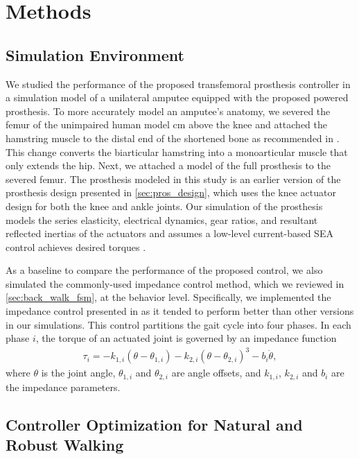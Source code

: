 \section{Methods}
\subsection{Simulation Environment}\label{sec:complete_simulation_environ}

We studied the performance of the proposed transfemoral prosthesis controller in
a simulation model of a unilateral amputee equipped with the proposed powered
prosthesis. To more accurately model an amputee's anatomy, we severed the femur
of the unimpaired human model \unit[11]{cm} above the knee and attached the
hamstring muscle to the distal end of the shortened bone as recommended in
\citet{brown2012amputation}. This change converts the biarticular hamstring into
a monoarticular muscle that only extends the hip. Next, we attached a model of
the full prosthesis to the severed femur. The prosthesis modeled in this study
is an earlier version of the prosthesis design presented in
\cref{sec:pros_design}, which uses the knee actuator design for both the knee
and ankle joints. Our simulation of the prosthesis models the series elasticity,
electrical dynamics, gear ratios, and resultant reflected inertias of the
actuators and assumes a low-level current-based SEA control achieves desired
torques \citep{pratt1995series}.

As a baseline to compare the performance of the proposed control, we also
simulated the commonly-used impedance control method, which we reviewed in
\cref{sec:back_walk_fsm}, at the behavior level.  Specifically, we implemented
the impedance control presented in \citet{sup2008design} as it tended to perform
better than other versions in our simulations. This control partitions the gait
cycle into four phases. In each phase $i$, the torque of an actuated joint is
governed by an impedance function
\begin{align} 
    \tau_i = -k_{1,i} (\theta - \theta_{1,i}) - k_{2,i} 
        {(\theta - \theta_{2,i})}^3 - b_i \dot{\theta}, 
\end{align} 
where $\theta$ is the joint angle, $\theta_{1,i}$ and $\theta_{2,i}$ are angle
offsets, and $k_{1,i}$, $k_{2,i}$ and $b_i$ are the impedance parameters.  

\subsection{Controller Optimization for Natural and Robust
Walking}\label{sec:completed_comparison_opt}


